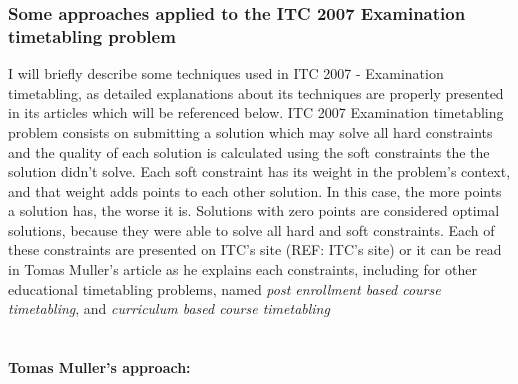 \subsubsection{Some approaches applied to the ITC 2007 Examination timetabling problem}
\label{subsection:ApprITC2007}

I will briefly describe some techniques used in ITC 2007 - Examination timetabling, as detailed explanations about its techniques are properly presented in its articles which will be referenced below. ITC 2007 Examination timetabling problem consists on submitting a solution which may solve all hard constraints and the quality of each solution is calculated using the soft constraints the the solution didn't solve. Each soft constraint has its weight in the problem's context, and that weight adds points to each other solution. In this case, the more points a solution has, the worse it is. Solutions with zero points are considered optimal solutions, because they were able to solve all hard and soft constraints. Each of these constraints are presented on ITC's site (REF: ITC's site) or it can be read in Tomas Muller's article as he explains each constraints, including for other educational timetabling problems, named \textit{post enrollment based course timetabling}, and \textit{curriculum based course timetabling}\\
\\

\paragraph{\textbf{Tomas Muller's approach:}}

